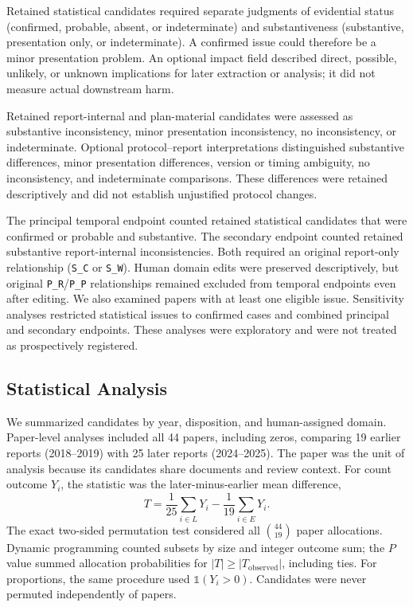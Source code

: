 Retained statistical candidates required separate judgments of evidential status (confirmed, probable, absent, or indeterminate) and substantiveness (substantive, presentation only, or indeterminate). A confirmed issue could therefore be a minor presentation problem. An optional impact field described direct, possible, unlikely, or unknown implications for later extraction or analysis; it did not measure actual downstream harm.

Retained report-internal and plan-material candidates were assessed as substantive inconsistency, minor presentation inconsistency, no inconsistency, or indeterminate. Optional protocol--report interpretations distinguished substantive differences, minor presentation differences, version or timing ambiguity, no inconsistency, and indeterminate comparisons. These differences were retained descriptively and did not establish unjustified protocol changes.

The principal temporal endpoint counted retained statistical candidates that were confirmed or probable and substantive. The secondary endpoint counted retained substantive report-internal inconsistencies. Both required an original report-only relationship (\texttt{S\_C} or \texttt{S\_W}). Human domain edits were preserved descriptively, but original \texttt{P\_R}/\texttt{P\_P} relationships remained excluded from temporal endpoints even after editing. We also examined papers with at least one eligible issue. Sensitivity analyses restricted statistical issues to confirmed cases and combined principal and secondary endpoints. These analyses were exploratory and were not treated as prospectively registered.

\subsection{Statistical Analysis}
\label{sec:statistics}

We summarized candidates by year, disposition, and human-assigned domain. Paper-level analyses included all 44 papers, including zeros, comparing 19 earlier reports (2018--2019) with 25 later reports (2024--2025). The paper was the unit of analysis because its candidates share documents and review context. For count outcome \(Y_i\), the statistic was the later-minus-earlier mean difference,
\[
T=\frac{1}{25}\sum_{i\in L}Y_i-\frac{1}{19}\sum_{i\in E}Y_i.
\]
The exact two-sided permutation test considered all \(\binom{44}{19}\) paper allocations. Dynamic programming counted subsets by size and integer outcome sum; the \(P\) value summed allocation probabilities for \(|T|\geq|T_{\mathrm{observed}}|\), including ties. For proportions, the same procedure used \(\mathbb{1}(Y_i>0)\). Candidates were never permuted independently of papers.

